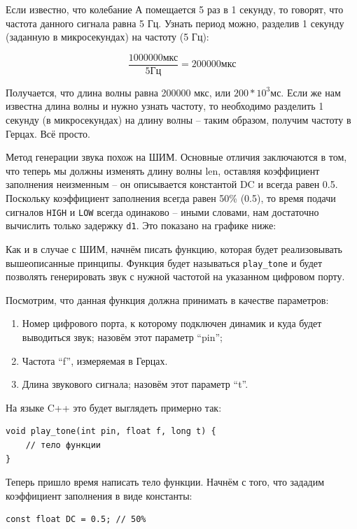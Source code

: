 \documentclass[a4paper,twoside]{book}
\begin{document}
Если известно, что колебание А помещается 5 раз в 1 секунду, то говорят, что
частота данного сигнала равна 5 Гц. Узнать период можно, разделив 1 секунду
(заданную в микросекундах) на частоту (5 Гц):

\begin{equation}
  \frac{1000000 \mbox{мкс}}{5 \mbox{Гц}} = 200000 \mbox{мкс}
\end{equation}

Получается, что длина волны равна 200000 мкс, или $ 200 * 10^3 \mbox{мс} $. Если
же нам известна длина волны и нужно узнать частоту, то необходимо разделить 1
секунду (в микросекундах) на длину волны -- таким образом, получим частоту в
Герцах. Всё просто.

Метод генерации звука похож на ШИМ. Основные отличия заключаются в том, что
теперь мы должны изменять длину волны len, оставляя коэффициент заполнения
неизменным -- он описывается константой DC и всегда равен 0.5. Поскольку
коэффициент заполнения всегда равен 50\% (0.5), то время подачи сигналов
\texttt{HIGH} и \texttt{LOW} всегда одинаково -- иными словами, нам достаточно
вычислить только задержку \texttt{d1}. Это показано на графике ниже:

Как и в случае с ШИМ, начнём писать функцию, которая будет реализовывать
вышеописанные принципы. Функция будет называться \texttt{play\_tone} и будет
позволять генерировать звук с нужной частотой на указанном цифровом порту.

Посмотрим, что данная функция должна принимать в качестве параметров:
\begin{enumerate}
\item Номер цифрового порта, к которому подключен динамик и куда будет
  выводиться звук; назовём этот параметр ``pin'';
\item Частота ``f'', измеряемая в Герцах. 
\item Длина звукового сигнала; назовём этот параметр ``t''.
\end{enumerate}

На языке C++ это будет выглядеть примерно так:
\begin{verbatim}
void play_tone(int pin, float f, long t) {
    // тело функции
}
\end{verbatim}

Теперь пришло время написать тело функции. Начнём с того, что зададим
коэффициент заполнения в виде константы:
\begin{verbatim}
const float DC = 0.5; // 50%
\end{verbatim}
\end{document}
